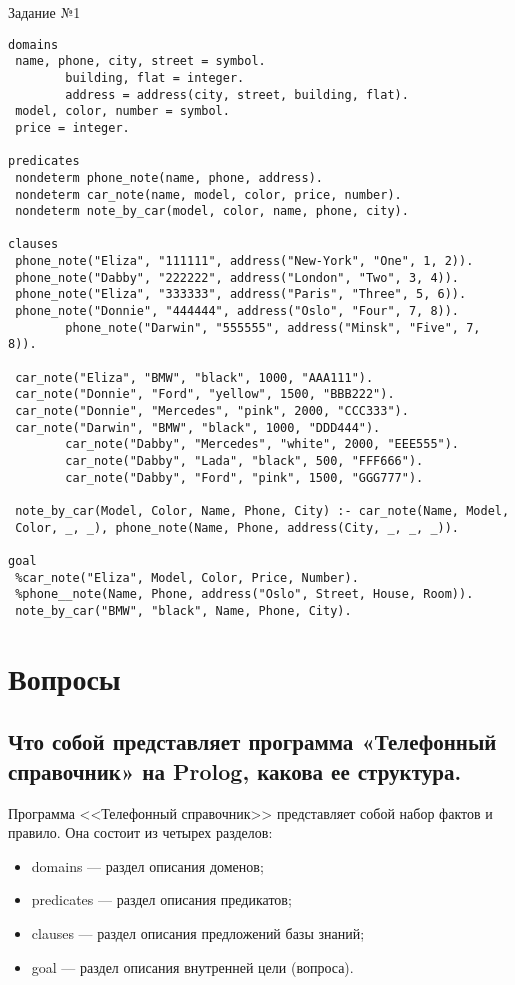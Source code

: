 \begin{code}
\caption{Задание №1}
\label{code:bf2}
\begin{verbatim}
domains
 name, phone, city, street = symbol.
        building, flat = integer.
        address = address(city, street, building, flat).
 model, color, number = symbol.
 price = integer.

predicates
 nondeterm phone_note(name, phone, address).
 nondeterm car_note(name, model, color, price, number).
 nondeterm note_by_car(model, color, name, phone, city).

clauses
 phone_note("Eliza", "111111", address("New-York", "One", 1, 2)).
 phone_note("Dabby", "222222", address("London", "Two", 3, 4)).
 phone_note("Eliza", "333333", address("Paris", "Three", 5, 6)).
 phone_note("Donnie", "444444", address("Oslo", "Four", 7, 8)).
        phone_note("Darwin", "555555", address("Minsk", "Five", 7, 8)).
 
 car_note("Eliza", "BMW", "black", 1000, "AAA111").
 car_note("Donnie", "Ford", "yellow", 1500, "BBB222").
 car_note("Donnie", "Mercedes", "pink", 2000, "CCC333").
 car_note("Darwin", "BMW", "black", 1000, "DDD444").
        car_note("Dabby", "Mercedes", "white", 2000, "EEE555").
        car_note("Dabby", "Lada", "black", 500, "FFF666").
        car_note("Dabby", "Ford", "pink", 1500, "GGG777").
 
 note_by_car(Model, Color, Name, Phone, City) :- car_note(Name, Model, 
 Color, _, _), phone_note(Name, Phone, address(City, _, _, _)).
 
goal
 %car_note("Eliza", Model, Color, Price, Number).
 %phone__note(Name, Phone, address("Oslo", Street, House, Room)).
 note_by_car("BMW", "black", Name, Phone, City).
\end{verbatim}
\end{code}

\section{Вопросы}

\subsection{Что собой представляет программа «Телефонный справочник» на Prolog, какова ее структура. }

Программа <<Телефонный справочник>> представляет собой набор фактов и правило. Она состоит из четырех разделов:
\begin{itemize}
	\item domains --- раздел описания доменов;
	\item predicates --- раздел описания предикатов;
	\item clauses --- раздел описания предложений базы знаний;
	\item goal --- раздел описания внутренней цели (вопроса).
\end{itemize}

